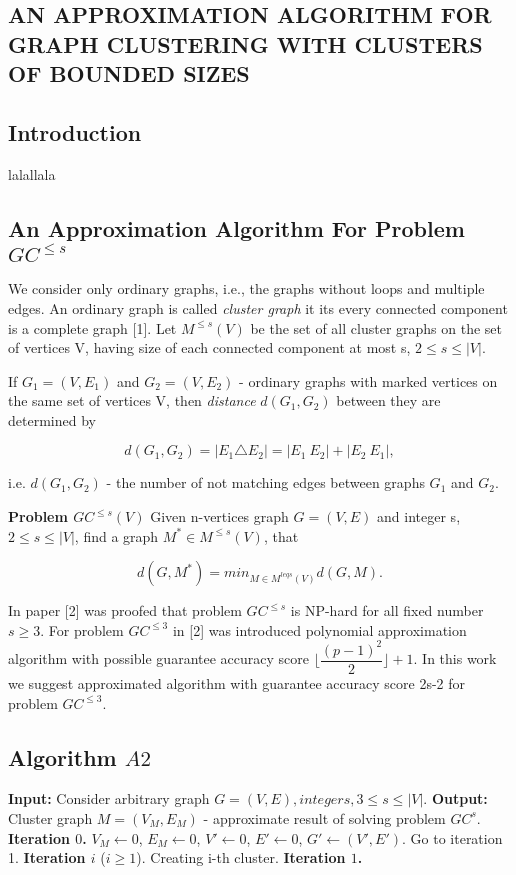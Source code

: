 \documentclass[12pt]{article}
\begin{document}
\begin{center}
	\section*{AN APPROXIMATION ALGORITHM FOR GRAPH CLUSTERING WITH CLUSTERS OF BOUNDED SIZES}
	\subsection*{Introduction}
\end{center}

lalallala

	\subsection*{An Approximation Algorithm For Problem $GC^{ \leq s} $}


We consider only ordinary graphs, i.e., the graphs without loops and multiple edges. An ordinary graph is called \textit{cluster graph} it its every connected component is a complete graph [1].
Let $M^{\leq s}(V)$ be the set of all cluster graphs on the set of vertices V, having size of each connected component at most s, $ 2 \leq s \leq |V|$.

If $G_1 = (V,E_1)$ and $G_2 = (V, E_2)$ - ordinary graphs with marked vertices on the same set of vertices V, then \textit{distance} $d(G_1,G_2)$ between they are determined by

$$
d(G_1,G_2) = |E_1\triangle E_2| = |E_1 \ E_2| + |E_2\ E_1|,
$$

i.e. $d(G_1,G_2)$ - the number of not matching edges between graphs $G_1$ and $G_2$.

\textbf{Problem $GC^{\leq s}(V)$} Given n-vertices  graph $G = (V,E)$ and integer s,  $2 \leq s \leq |V|$, find a graph $M^* \in M^{\leq s}(V)$, that

$$
d(G,M^*)= min_{M\in M^{leq s}(V)}d(G,M).
$$

In paper [2] was proofed that problem $GC^{\leq s}$ is NP-hard for all fixed number $s \geq 3$. For problem $GC^{\leq 3}$ in [2] was introduced polynomial approximation algorithm  with possible guarantee accuracy score
$ \lfloor \dfrac{(p-1)^2}{2} \rfloor + 1$. In this work we suggest approximated algorithm with guarantee accuracy score 2s-2 for problem $GC^{\leq 3}$. %


	\subsection*{Algorithm $A2$}
\textbf{Input:} Consider arbitrary graph $ G = (V,E), integer s, 3 \leq s \leq |V|$.
\textbf{Output:} Cluster graph $M = (V_M,E_M)$ - approximate result of solving problem $GC^{s}$.
\textbf{Iteration $0$.} $V_M \leftarrow 0$, $E_M \leftarrow 0$, $V' \leftarrow 0$, $E' \leftarrow 0$, $G' \leftarrow (V',E')$. Go to iteration 1.
\textbf{Iteration $i$} ($i \geq 1 $). Creating i-th cluster.
\textbf{Iteration $1$.} 
\end{document}
